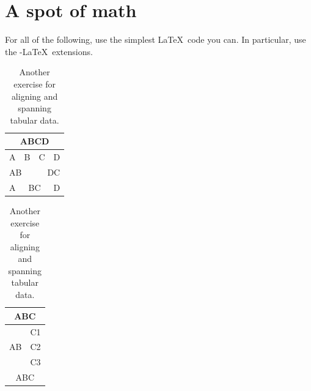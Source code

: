 \documentclass[10pt,a4paper]{article}
\theoremstyle{definition}
\begin{document}
    \section{A spot of math}
    For all of the following, use the simplest \LaTeX\ code you can. In particular, use the
    \AmS-\LaTeX\ extensions.
    
    \begin{table}[tb]
    \begin{minipage}[t]{0.45\textwidth}
        \caption{An alignment and spanning exercise for tabular data.}
        \label{table:abcd}
        \centering
        \begin{tabular}{||c|c|c|c||}
            \hline\hline
            \multicolumn{4}{||c||}{ABCD} \\
            \hline\hline
            A & B & C & D \\
            \hline
            \multicolumn{2}{||l|}{AB} & \multicolumn{2}{|r||}{DC} \\
            \hline
            A & \multicolumn{2}{|c|}{BC} & D \\
            \hline\hline
        \end{tabular}
    \end{minipage}
    \hfill
    \begin{minipage}[t]{0.45\textwidth}
        \centering
        \caption{Another exercise for aligning and spanning tabular data.}
        \label{table:abc}
        \begin{tabular}{|c|c|}
            \hline
            \multicolumn{2}{c}{ABC} \\
            \hline\hline
            \multirow{3}{*}{AB} & C1 \\
            \cline{2-2} & C2 \\
            \cline{2-2} & C3 \\
            \hline\hline
            \multicolumn{2}{c}{ABC} \\
            \hline
        \end{tabular}
    \end{minipage}
    \end{table}
    
\end{document}
